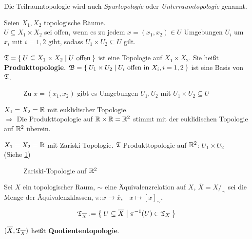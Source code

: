 Die Teilraumtopologie wird auch \textit{Spurtopologie} oder 
\textit{Unterraumtopologie} genannt.

\begin{definition}%
    Seien $X_1, X_2$ topologische Räume.\\
    $U \subseteq X_1 \times X_2$ sei offen, wenn es zu jedem $x = (x_1, x_2) \in U$
    Umgebungen $U_i$ um $x_i$  mit $i=1,2$ gibt, sodass $U_1 \times U_2 \subseteq U$
    gilt.

    $\mathfrak{T} = \Set{U \subseteq X_1 \times X_2 | U \text{ offen}}$
    ist eine Topologie auf $X_1 \times X_2$. Sie heißt \textbf{Produkttopologie}.
    $\mathfrak{B} = \Set{U_1 \times U_2 | U_i \text{ offen in } X_i, i=1,2}$
    ist eine Basis von $\mathfrak{T}$.
\end{definition}

\begin{figure}[htp]
    \centering
    
    \caption{Zu $x=(x_1, x_2)$ gibt es Umgebungen $U_1, U_2$ mit $U_1 \times U_2 \subseteq U$}
\end{figure}

\begin{beispiel}[Produkttopologien]
    \begin{bspenum}
        \item $X_1 = X_2 = \mathbb{R}$ mit euklidischer Topologie.\\
              $\Rightarrow$ Die Produkttopologie auf $\mathbb{R} \times \mathbb{R} = \mathbb{R}^2$
              stimmt mit der euklidischen Topologie auf $\mathbb{R}^2$ überein.
        \item $X_1 = X_2 = \mathbb{R}$ mit Zariski-Topologie.
              $\mathfrak{T}$ Produkttopologie auf $\mathbb{R}^2$: $U_1 \times U_2$\\
              (Siehe \cref{fig:zariski-topologie})
    \end{bspenum}

    \begin{figure}[htp]
        \centering
        
        \caption{Zariski-Topologie auf $\mathbb{R}^2$}
        \label{fig:zariski-topologie}
    \end{figure}
\end{beispiel}

\begin{definition}%
    Sei $X$ ein topologischer Raum, $\sim$ eine Äquivalenzrelation auf $X$,
    $\overline{X} = X /_\sim$ sei die Menge der Äquivalenzklassen,
    $\pi: x \rightarrow \overline{x}, \;\;\; x \mapsto [x]_\sim$.

    \[\mathfrak{T}_{\overline{X}} := \Set{U \subseteq \overline{X} | \pi^{-1}(U) \in \mathfrak{T}_X}\]

    $(\overline{X}, \mathfrak{T}_{\overline{X}})$ heißt \textbf{Quotiententopologie}.
\end{definition}

